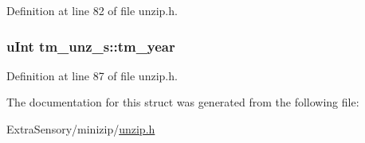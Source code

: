 Definition at line 82 of file unzip.\+h.

\hypertarget{structtm__unz__s_a5f17147e3cfbbfdbeb2e29cbc1df8136}{
\subsubsection[{tm\+\_\+year}]{\setlength{\rightskip}{0pt plus 5cm}u\+Int tm\+\_\+unz\+\_\+s\+::tm\+\_\+year}}\label{structtm__unz__s_a5f17147e3cfbbfdbeb2e29cbc1df8136}


Definition at line 87 of file unzip.\+h.



The documentation for this struct was generated from the following file\+:\begin{DoxyCompactItemize}
\item 
Extra\+Sensory/minizip/\hyperlink{unzip_8h}{unzip.\+h}\end{DoxyCompactItemize}
